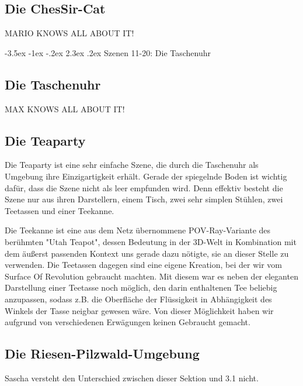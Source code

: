 \documentclass[twocolumn]{article}
\makeatletter
\renewcommand\section{\@startsection{section}{1}{\z@}%
                                      {-3.5ex \@plus -1ex \@minus -.2ex}%
                                      {2.3ex \@plus.2ex}%
                                      {\normalfont\large\bfseries}}
\makeatother
\begin{document}
\subsection{Die ChesSir-Cat}
MARIO KNOWS ALL ABOUT IT!

\section{Szenen 11-20: Die Taschenuhr}
\subsection{Die Taschenuhr}
MAX KNOWS ALL ABOUT IT!

\subsection{Die Teaparty}
Die Teaparty ist eine sehr einfache Szene, die durch die Taschenuhr als Umgebung ihre Einzigartigkeit erhält.
Gerade der spiegelnde Boden ist wichtig dafür, dass die Szene nicht als leer empfunden wird.
Denn effektiv besteht die Szene nur aus ihren Darstellern, einem Tisch, zwei sehr simplen Stühlen, zwei Teetassen und einer Teekanne.

Die Teekanne ist eine aus dem Netz übernommene POV-Ray-Variante des berühmten "Utah Teapot", dessen Bedeutung in der 3D-Welt in Kombination mit dem äußerst passenden Kontext uns gerade dazu nötigte, sie an dieser Stelle zu verwenden.
Die Teetassen dagegen sind eine eigene Kreation, bei der wir vom Surface Of Revolution gebraucht machten. Mit diesem war es neben der eleganten Darstellung einer Teetasse noch möglich, den darin enthaltenen Tee beliebig anzupassen, sodass z.B. die Oberfläche der Flüssigkeit in Abhängigkeit des Winkels der Tasse neigbar gewesen wäre.
Von dieser Möglichkeit haben wir aufgrund von verschiedenen Erwägungen keinen Gebraucht gemacht.

\subsection{Die Riesen-Pilzwald-Umgebung}
Sascha versteht den Unterschied zwischen dieser Sektion und 3.1 nicht.
\end{document}
